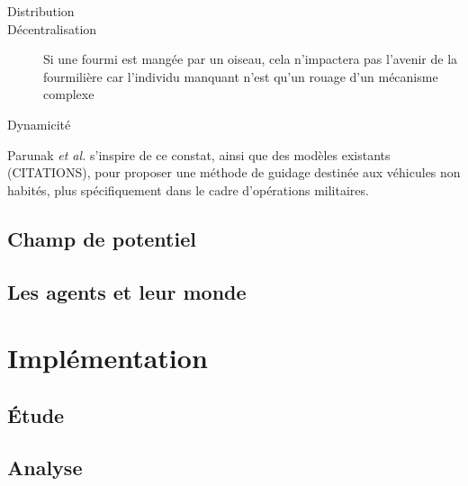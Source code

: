 \documentclass[12pt]{article}
\begin{document}
\begin{description}
  \item[Distribution]{}
  \item[Décentralisation]{Si une fourmi est mangée par un oiseau, cela
  n'impactera pas l'avenir de la fourmilière car l'individu manquant
  n'est qu'un rouage d'un mécanisme complexe}
  \item[Dynamicité]{}
\end{description}

Parunak \textit{et al.} s'inspire de ce constat, ainsi que des modèles
existants (CITATIONS), pour proposer une méthode de guidage destinée
aux véhicules non habités, plus spécifiquement dans le cadre
d'opérations militaires.

\subsection{Champ de potentiel}

\subsection{Les agents et leur monde}

\section{Implémentation}

\subsection{\'Etude}

\subsection{Analyse}



\end{document}
